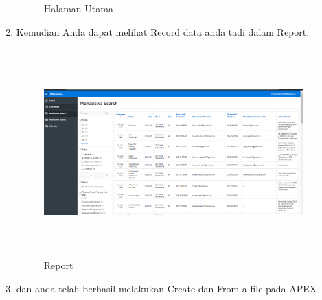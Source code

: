 \begin{enumerate}
\begin{figure}[!htbp]
\caption{Halaman Utama}
\label{penanda}
\end{figure}
\item Kemudian Anda dapat melihat Record data anda tadi dalam Report.
\begin{figure}[!htbp]
\centering
\includegraphics[width=10cm,height=8cm]{figures/M.PNG}
\caption{Report}
\label{penanda}
\end{figure}
\item dan anda telah berhasil melakukan Create dan From a file pada APEX
\end{enumerate}
